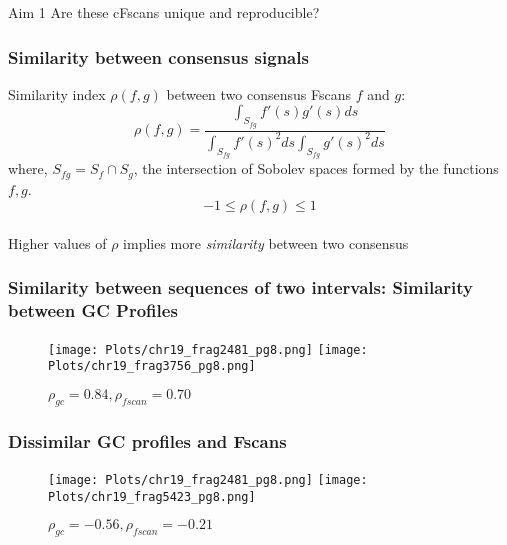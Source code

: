 \documentclass[10pt,dvipsnames,table]{beamer}
\begin{document}
\begin{frame}
\Large
\begin{block}{Aim 1}
Are these cFscans unique and reproducible?
\end{block}
\end{frame}

\begin{frame}
\frametitle{Similarity between consensus signals}
Similarity index $\rho(f, g)$ between two consensus Fscans $f$ and $g$:
\[ \rho(f, g) = \frac{\int _{S_{fg}}f'(s)g'(s) ds}{\int _{S_{fg}}f'(s)^2 ds \int _{S_{fg}}g'(s)^2 ds} \]
where, $S_{fg} = S_f \cap S_g$, the intersection of Sobolev spaces formed by the functions $f, g$.\\
\[-1 \leq \rho(f, g) \leq 1\] \\
Higher values of $\rho$ implies more {\emph{similarity}} between two consensus

\end{frame}

\begin{frame}
\frametitle{Similarity between sequences of two intervals: Similarity between GC Profiles}
\begin{figure}
\centering
\texttt{[image: Plots/chr19\_frag2481\_pg8.png]}
\hspace{0.5cm}
\texttt{[image: Plots/chr19\_frag3756\_pg8.png]}
\caption{$\rho_{gc} = 0.84, \rho_{fscan} = 0.70$}
\end{figure}
\end{frame}

\begin{frame}
\frametitle{Dissimilar GC profiles and Fscans}
\begin{figure}
\centering
\texttt{[image: Plots/chr19\_frag2481\_pg8.png]}
\hspace{0.5cm}
\texttt{[image: Plots/chr19\_frag5423\_pg8.png]}
\caption{$\rho_{gc} = -0.56, \rho_{fscan} = -0.21$}
\end{figure}

\end{frame}
\end{document}
